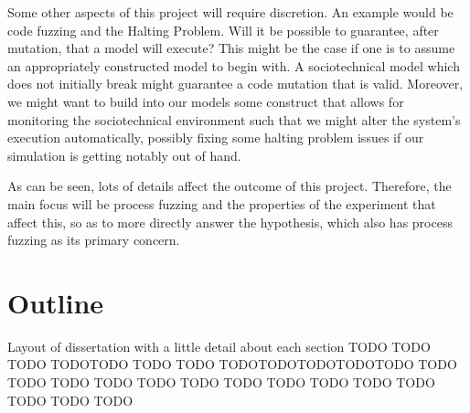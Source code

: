 Some other aspects of this project will require discretion. An example would be code fuzzing and the Halting Problem. Will it be possible to guarantee, after mutation, that a model will execute? This might be the case if one is to assume an appropriately constructed model to begin with. A sociotechnical model which does not initially break might guarantee a code mutation that is valid. Moreover, we might want to build into our models some construct that allows for monitoring the sociotechnical environment such that we might alter the system's execution automatically, possibly fixing some halting problem issues if our simulation is getting notably out of hand. \par%

As can be seen, lots of details affect the outcome of this project. Therefore, the main focus will be process fuzzing and the properties of the experiment that affect this, so as to more directly answer the hypothesis, which also has process fuzzing as its primary concern. \par%


\section{Outline}
\label{outline}
Layout of dissertation with a little detail about each section TODO
TODO
TODO
TODOTODO
TODO
TODO
TODOTODOTODOTODOTODO
TODO
TODO
TODO
TODO
TODO
TODO
TODO
TODO
TODO
TODO
TODO
TODO
TODO
TODO
